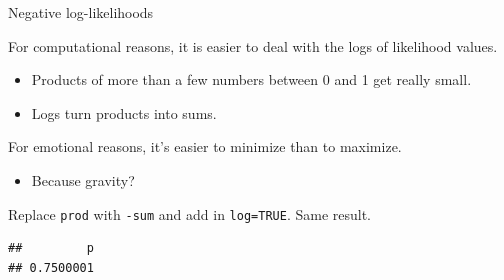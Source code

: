 \documentclass[
  ignorenonframetext,
]{beamer}
\newenvironment{Shaded}{\begin{snugshade}}{\end{snugshade}}
\newcommand{\CommentTok}[1]{\textcolor[rgb]{0.56,0.35,0.01}{\textit{#1}}}
\newcommand{\ControlFlowTok}[1]{\textcolor[rgb]{0.13,0.29,0.53}{\textbf{#1}}}
\newcommand{\DataTypeTok}[1]{\textcolor[rgb]{0.13,0.29,0.53}{#1}}
\newcommand{\FloatTok}[1]{\textcolor[rgb]{0.00,0.00,0.81}{#1}}
\newcommand{\KeywordTok}[1]{\textcolor[rgb]{0.13,0.29,0.53}{\textbf{#1}}}
\newcommand{\NormalTok}[1]{#1}
\newcommand{\OperatorTok}[1]{\textcolor[rgb]{0.81,0.36,0.00}{\textbf{#1}}}
\newcommand{\OtherTok}[1]{\textcolor[rgb]{0.56,0.35,0.01}{#1}}
\newcommand{\StringTok}[1]{\textcolor[rgb]{0.31,0.60,0.02}{#1}}
\providecommand{\tightlist}{%
  \setlength{\itemsep}{0pt}\setlength{\parskip}{0pt}}
\begin{document}
\begin{frame}[fragile]{Negative log-likelihoods}
\protect\hypertarget{negative-log-likelihoods}{}

For computational reasons, it is easier to deal with the logs of
likelihood values.

\begin{itemize}
\tightlist
\item
  Products of more than a few numbers between 0 and 1 get really small.
\item
  Logs turn products into sums.
\end{itemize}

For emotional reasons, it's easier to minimize than to maximize.

\begin{itemize}
\tightlist
\item
  Because gravity?
\end{itemize}

Replace \texttt{prod} with \texttt{-sum} and add in \texttt{log=TRUE}.
Same result.

\scriptsize

\begin{Shaded}
\end{Shaded}

\begin{verbatim}
##         p 
## 0.7500001
\end{verbatim}

\end{frame}
\end{document}
